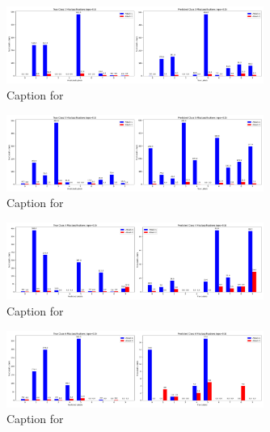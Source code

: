\documentclass{article}
\begin{document}
\begin{figure}[!htbp]
\centering
\includegraphics[width=0.75\textwidth]{combined_class_boundary_pgd/combined_class_3_misclassifications_eps_0.5.png}
\caption{Caption for }
\label{fig:combined_class_3_misclassifications_eps_0.5.png}
\end{figure}

\begin{figure}[!htbp]
\centering
\includegraphics[width=0.75\textwidth]{combined_class_boundary_pgd/combined_class_5_misclassifications_eps_0.5.png}
\caption{Caption for }
\label{fig:combined_class_5_misclassifications_eps_0.5.png}
\end{figure}

\begin{figure}[!htbp]
\centering
\includegraphics[width=0.75\textwidth]{combined_class_boundary_pgd/combined_class_4_misclassifications_eps_0.5.png}
\caption{Caption for }
\label{fig:combined_class_4_misclassifications_eps_0.5.png}
\end{figure}

\begin{figure}[!htbp]
\centering
\includegraphics[width=0.75\textwidth]{combined_class_boundary_pgd/combined_class_6_misclassifications_eps_0.5.png}
\caption{Caption for }
\label{fig:combined_class_6_misclassifications_eps_0.5.png}
\end{figure}
\end{document}
